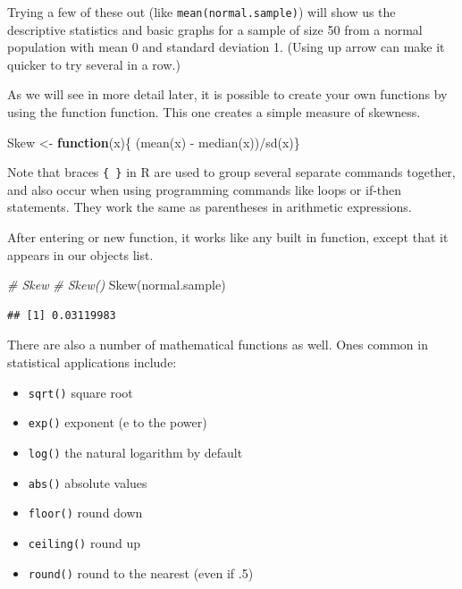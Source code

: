 \documentclass[
]{book}
\newenvironment{Shaded}{\begin{snugshade}}{\end{snugshade}}
\newcommand{\CommentTok}[1]{\textcolor[rgb]{0.56,0.35,0.01}{\textit{#1}}}
\newcommand{\ControlFlowTok}[1]{\textcolor[rgb]{0.13,0.29,0.53}{\textbf{#1}}}
\newcommand{\FunctionTok}[1]{\textcolor[rgb]{0.00,0.00,0.00}{#1}}
\newcommand{\NormalTok}[1]{#1}
\newcommand{\OtherTok}[1]{\textcolor[rgb]{0.56,0.35,0.01}{#1}}
\newcommand{\SpecialCharTok}[1]{\textcolor[rgb]{0.00,0.00,0.00}{#1}}
\providecommand{\tightlist}{%
  \setlength{\itemsep}{0pt}\setlength{\parskip}{0pt}}
\begin{document}
Trying a few of these out (like \texttt{mean(normal.sample)}) will show us the descriptive statistics and basic graphs for a sample of size 50 from a normal population with mean 0 and standard deviation 1. (Using up arrow can make it quicker to try several in a row.)

As we will see in more detail later, it is possible to create your own functions by using the function function. This one creates a simple measure of skewness.

\begin{Shaded}
\begin{Highlighting}[]
\NormalTok{Skew }\OtherTok{\textless{}{-}} \ControlFlowTok{function}\NormalTok{(x)\{}
\NormalTok{    (}\FunctionTok{mean}\NormalTok{(x) }\SpecialCharTok{{-}} \FunctionTok{median}\NormalTok{(x))}\SpecialCharTok{/}\FunctionTok{sd}\NormalTok{(x)\}}
\end{Highlighting}
\end{Shaded}

Note that braces \texttt{\{\ \}} in R are used to group several separate commands together, and also occur when using programming commands like loops or if-then statements. They work the same as parentheses in arithmetic expressions.

After entering or new function, it works like any built in function, except that it appears in our objects list.

\begin{Shaded}
\begin{Highlighting}[]
\CommentTok{\# Skew}
\CommentTok{\# Skew()}
\FunctionTok{Skew}\NormalTok{(normal.sample)}
\end{Highlighting}
\end{Shaded}

\begin{verbatim}
## [1] 0.03119983
\end{verbatim}

There are also a number of mathematical functions as well. Ones common in statistical applications include:

\begin{itemize}
\tightlist
\item
  \texttt{sqrt()} square root
\item
  \texttt{exp()} exponent (e to the power)
\item
  \texttt{log()} the natural logarithm by default
\item
  \texttt{abs()} absolute values
\item
  \texttt{floor()} round down
\item
  \texttt{ceiling()} round up
\item
  \texttt{round()} round to the nearest (even if .5)
\end{itemize}
\end{document}
